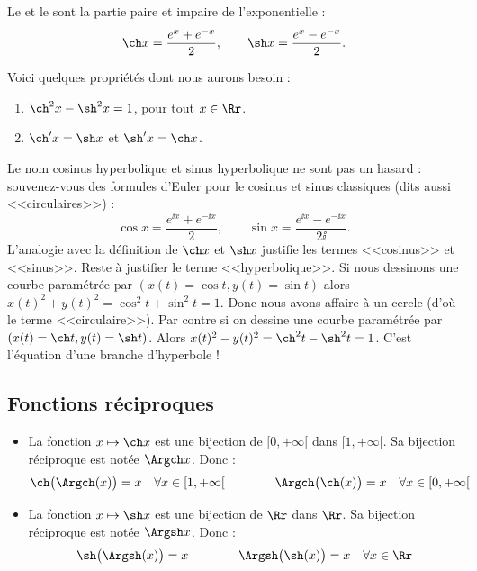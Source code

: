 \documentclass[class=report,crop=false]{standalone}
\begin{document}
Le  et le  sont la partie paire et impaire de l'exponentielle :
$$\ch x = \frac{e^x + e^{-x}}{2}, \qquad \sh x = \frac{e^x - e^{-x}}{2}.$$


Voici quelques propriétés dont nous aurons besoin :
\begin{proposition}
\label{prop:chainette1}
\begin{enumerate}
 \item $\ch^2 x - \sh^2 x = 1$, pour tout $x \in \Rr$.
 \item $\ch ' x = \sh x$ et $\sh' x = \ch x$.
\end{enumerate}
\end{proposition}

\begin{remarque*}
Le nom cosinus hyperbolique et sinus hyperbolique ne sont pas un hasard :
souvenez-vous des formules d'Euler pour le cosinus et sinus classiques (dits aussi <<circulaires>>) :
$$\cos x = \frac{e^{\ii x} + e^{-\ii x}}{2}, \qquad \sin x = \frac{e^{\ii x} - e^{-\ii x}}{2\ii}.$$
L'analogie avec la définition de $\ch x$ et $\sh x$ justifie les termes <<cosinus>> et <<sinus>>. 
Reste à justifier le terme <<hyperbolique>>.
Si nous dessinons une courbe paramétrée par $(x(t) = \cos t,y(t) = \sin t)$ alors
$x(t)^2+y(t)^2 = \cos^2 t + \sin^2 t =1$. Donc nous avons affaire à un cercle
(d'où le terme <<circulaire>>). 
Par contre si on dessine une courbe paramétrée par $(x(t) = \ch t, y(t) = \sh t)$.
Alors $x(t)^2 - y(t)^2 = \ch^2 t - \sh^2 t = 1$.
C'est l'équation d'une branche d'hyperbole ! 
\end{remarque*}

\subsection{Fonctions réciproques}

\begin{proposition}
\label{prop:chainette2}
\begin{itemize}
  \item La fonction $x \mapsto \ch x$ est une bijection
de $[0,+\infty[$ dans $[1,+\infty[$. Sa bijection réciproque est 
notée $\Argch x$. Donc :
$$\ch\big(\Argch(x)\big) = x  \quad \forall x \in [1,+\infty[ 
\qquad\qquad  \Argch\big(\ch(x)\big) = x
\quad   \forall x \in [0,+\infty[$$

  \item  La fonction $x \mapsto \sh x$ est une bijection
de $\Rr$ dans $\Rr$. Sa bijection réciproque est 
notée $\Argsh x$. Donc :
$$\sh\big(\Argsh(x)\big) = x  \qquad\qquad  \Argsh\big(\sh(x)\big) = x
\quad   \forall x \in \Rr$$

\end{itemize}
\end{proposition}
\end{document}
